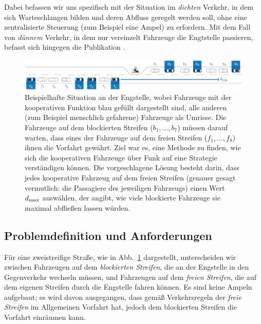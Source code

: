 Dabei befassen wir uns spezifisch mit der Situation im \emph{dichten} Verkehr, in dem sich Warteschlangen bilden und deren Abfluss geregelt werden soll, ohne eine zentralisierte Steuerung (zum Beispiel eine Ampel) zu erfordern. Mit dem Fall von \emph{dünnem} Verkehr, in dem nur vereinzelt Fahrzeuge die Engtstelle passieren, befasst sich hingegen die Publikation \cite{naumann2017cooperativePlanning}.








		
		
\begin{figure}%
\begin{thinmargin}
\includegraphics[width=\textwidth]{content/bottleneck/images/2021-bottleneck-paper}%
\caption{Beispielhafte Situation an der Engstelle, wobei Fahrzeuge mit der kooperativen Funktion blau gefüllt dargestellt sind, alle anderen (zum Beispiel menschlich gefahrene) Fahrzeuge als Umrisse. Die Fahrzeuge auf dem blockierten Streifen ($b_1, ..., b_7$) müssen darauf warten, dass eines der Fahrzeuge auf dem freien Streifen ($f_1, ..., f_8$) ihnen die Vorfahrt gewährt. Ziel war es, eine Methode zu finden, wie sich die kooperativen Fahrzeuge über Funk auf eine Strategie verständigen können. Die vorgeschlagene Lösung besteht darin, dass jedes kooperative Fahrzeug auf dem freien Streifen (genauer gesagt vermutlich: die Passagiere des jeweiligen Fahrzeugs) einen Wert ${d}_{\text{max}}$ auswählen, der angibt, wie viele blockierte Fahrzeuge sie maximal abfließen lassen würden.}%
\label{fig:example}%
\end{thinmargin}
\end{figure}


\subsection{Problemdefinition und Anforderungen}\label{sec:problem-definition}


Für eine zweistreifige Straße, wie in Abb.~\ref{fig:example} dargestellt, unterscheiden wir zwischen Fahrzeugen auf dem \emph{blockierten Streifen}, die an der Engstelle in den Gegenverkehr wechseln müssen, und Fahrzeugen auf dem \emph{freien Streifen}, die auf dem eigenen Streifen durch die Engstelle fahren können. Es sind keine Ampeln aufgebaut; es wird davon ausgegangen, dass gemäß Verkehrsregeln der \emph{freie Streifen} im Allgemeinen Vorfahrt hat, jedoch dem blockierten Streifen die Vorfahrt einräumen kann.

